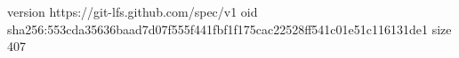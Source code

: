 version https://git-lfs.github.com/spec/v1
oid sha256:553cda35636baad7d07f555f441fbf1f175cac22528ff541c01e51c116131de1
size 407
